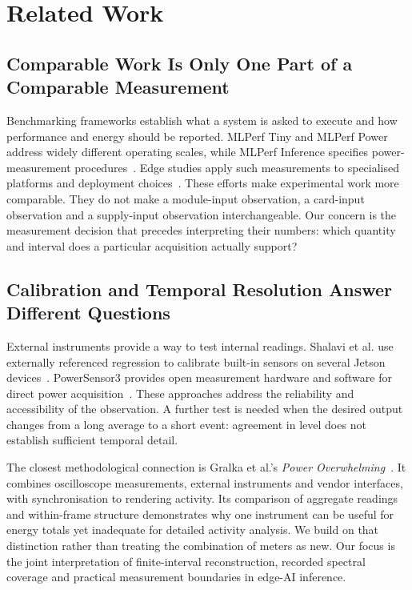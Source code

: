 \section{Related Work}
\subsection{Comparable Work Is Only One Part of a Comparable Measurement}
Benchmarking frameworks establish what a system is asked to execute and how performance and energy should be reported. MLPerf Tiny and MLPerf Power address widely different operating scales, while MLPerf Inference specifies power-measurement procedures~\cite{banbury2021mlperftiny,tschand2024mlperfpower,mlcommonsInferencePower}. Edge studies apply such measurements to specialised platforms and deployment choices~\cite{liang2020,baller2021,libutti2020usbaccelerators}. These efforts make experimental work more comparable. They do not make a module-input observation, a card-input observation and a supply-input observation interchangeable. Our concern is the measurement decision that precedes interpreting their numbers: which quantity and interval does a particular acquisition actually support?

\subsection{Calibration and Temporal Resolution Answer Different Questions}
External instruments provide a way to test internal readings. Shalavi et al. use externally referenced regression to calibrate built-in sensors on several Jetson devices~\cite{shalavi2023jetsoncalibration}. PowerSensor3 provides open measurement hardware and software for direct power acquisition~\cite{vanderVlugt2025powersensor3}. These approaches address the reliability and accessibility of the observation. A further test is needed when the desired output changes from a long average to a short event: agreement in level does not establish sufficient temporal detail.

The closest methodological connection is Gralka et al.'s \emph{Power Overwhelming}~\cite{gralka2024poweroverwhelming}. It combines oscilloscope measurements, external instruments and vendor interfaces, with synchronisation to rendering activity. Its comparison of aggregate readings and within-frame structure demonstrates why one instrument can be useful for energy totals yet inadequate for detailed activity analysis. We build on that distinction rather than treating the combination of meters as new. Our focus is the joint interpretation of finite-interval reconstruction, recorded spectral coverage and practical measurement boundaries in edge-AI inference.

